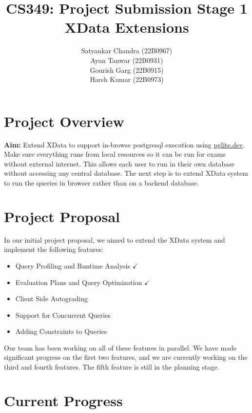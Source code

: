 \documentclass{article}
\begin{document}
\title{\large{CS349: Project Submission Stage 1} \\ \Huge \textbf{XData Extensions}}
\date{}
\author{Satyankar Chandra (22B0967) \\
Ayan Tanwar (22B0931) \\
Gourish Garg (22B0915) \\
Harsh Kumar (22B0973)}
\pagestyle{fancy}

\maketitle

\section{Project Overview}

\textbf{Aim:} Extend XData to support in-browse postgresql execution using \href{https://pglite.dev/}{pglite.dev}. Make sure everything runs from local resources so it can be run for exams without external internet. This allows each user to run in their own database without accessing any central database. The next step is to extend XData system to run the queries in browser rather than on a backend database.

\section{Project Proposal}

In our initial project proposal, we aimed to extend the XData system and implement the following features:
\begin{itemize}
    \item Query Profiling and Runtime Analysis $\checkmark$
    \item Evaluation Plans and Query Optimization $\checkmark$
    \item Client Side Autograding
    \item Support for Concurrent Queries
    \item Adding Constraints to Queries
\end{itemize}

Our team has been working on all of these features in parallel. We have made significant progress on the first two features, and we are currently working on the third and fourth features. The fifth feature is still in the planning stage.

\section{Current Progress}
\end{document}

